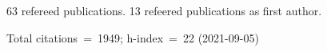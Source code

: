 63 refereed publications. 13 refeered publications as first author.

Total citations~=~1949; h-index~=~22 (2021-09-05)